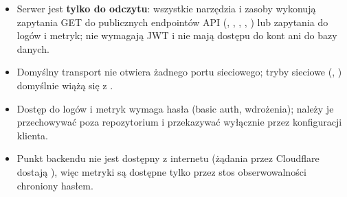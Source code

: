 \begin{itemize}[nosep]
  \item Serwer jest \textbf{tylko do odczytu}: wszystkie narzędzia i zasoby wykonują zapytania GET do publicznych endpointów API (, , , , ) lub zapytania do logów i metryk; nie wymagają JWT i nie mają dostępu do kont ani do bazy danych.
  \item Domyślny transport  nie otwiera żadnego portu sieciowego; tryby sieciowe (, ) domyślnie wiążą się z .
  \item Dostęp do logów i metryk wymaga hasła  (basic auth,  wdrożenia); należy je przechowywać poza repozytorium i przekazywać wyłącznie przez  konfiguracji klienta.
  \item Punkt  backendu nie jest dostępny z internetu (żądania przez Cloudflare dostają ), więc metryki są dostępne tylko przez stos obserwowalności chroniony hasłem.
\end{itemize}

